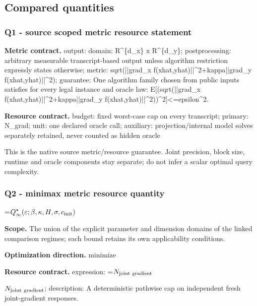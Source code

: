 \documentclass[10pt,a4paper]{article}
\newcommand{\AtlasMath}[1]{\par\begingroup\centering\setbox0=\hbox{$\displaystyle #1$}\ifdim\wd0>1.4\linewidth\typeout{ATLAS WIDE FORMULA: \the\wd0}\fi\ifdim\wd0>\linewidth\resizebox{\linewidth}{!}{\box0}\else\box0\fi\par\endgroup}
\newcommand{\AtlasInlineMath}[1]{\begingroup\setbox0=\hbox{$#1$}\ifdim\wd0>.4\linewidth\endgroup\AtlasMath{#1}\else\endgroup$#1$\fi}
\begin{document}
\subsection{Compared quantities}


\subsubsection{Q1 - source scoped metric resource statement}


\textbf{Metric contract.} output: domain: R\textasciicircum{}\{d\_x\} x R\textasciicircum{}\{d\_y\}; postprocessing: arbitrary measurable transcript-based output unless algorithm restriction expressly states otherwise; metric: sqrt(||grad\_x f(xhat,yhat)||\textasciicircum{}2+kappa||grad\_y f(xhat,yhat)||\textasciicircum{}2); guarantee: One algorithm family chosen from public inputs satisfies for every legal instance and oracle law: E[(sqrt(||grad\_x f(xhat,yhat)||\textasciicircum{}2+kappa||grad\_y f(xhat,yhat)||\textasciicircum{}2))\textasciicircum{}2]<=epsilon\textasciicircum{}2.



\textbf{Resource contract.} budget: fixed worst-case cap on every transcript; primary: N\_grad; unit: one declared oracle call; auxiliary: projection/internal model solves separately retained, never counted as hidden oracle



This is the native source metric/resource guarantee. Joint precision, block size, runtime and oracle components stay separate; do not infer a scalar optimal query complexity.



\subsubsection{Q2 - minimax metric resource quantity}


\AtlasMath{Q^\star_\infty(\varepsilon;\beta,\kappa,H,\sigma,c_{\rm init})}


\textbf{Scope.} The union of the explicit parameter and dimension domains of the linked comparison regimes; each bound retains its own applicability conditions.



\textbf{Optimization direction.} minimize



\textbf{Resource contract.} expression: \AtlasInlineMath{N_{\rm joint\ gradient}}; description: A deterministic pathwise cap on independent fresh joint-gradient responses.
\end{document}
